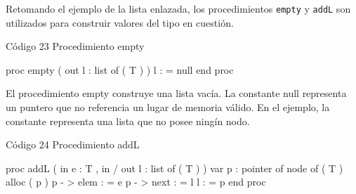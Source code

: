 Retomando el ejemplo de la lista enlazada, los procedimientos \texttt{empty} y \texttt{addL} son utilizados para construir valores del tipo en cuestión.

\begin{codebox}{Código 23}
\footnotesize Procedimiento empty
\tcblower
\begin{pascallike}
proc empty ( out l : list of ( T ) )
    l : = null
end proc
\end{pascallike}
\end{codebox}

El procedimiento empty construye una lista vacía. La constante null representa un puntero que no referencia un lugar de memoria válido. En el ejemplo, la constante representa una lista que no posee ningín nodo.

\begin{codebox}{Código 24}
\footnotesize Procedimiento addL
\tcblower
\begin{pascallike}
proc addL ( in e : T , in / out l : list of ( T ) )
    var p : pointer of node of ( T )
    alloc ( p )
    p - > elem : = e
    p - > next : = l
    l : = p
end proc
\end{pascallike}
\end{codebox}